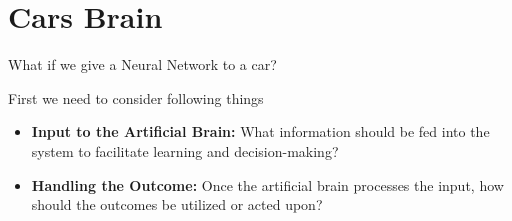 \documentclass{do}
\begin{document}
\section{Cars Brain}
\begin{frame}{What if we give a Neural Network to a car?}
    \begin{alertblock}{First we need to consider following things}

\begin{itemize}
        \item \textbf{Input to the Artificial Brain:} What information should be fed into the system to facilitate learning and decision-making?
        \item \textbf{Handling the Outcome:} Once the artificial brain processes the input, how should the outcomes be utilized or acted upon?
\end{itemize}
\end{alertblock}

\end{frame}
\end{document}
